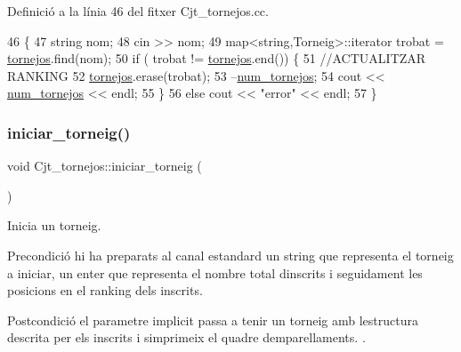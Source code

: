 Definició a la línia 46 del fitxer Cjt\+\_\+tornejos.\+cc.


\begin{DoxyCode}
46                                  \{
47     \textcolor{keywordtype}{string} nom;
48     cin >> nom;
49     map<string,Torneig>::iterator trobat = \mbox{\hyperlink{class_cjt__tornejos_a4b3d9bdd2ed133d76284fb510ebe9800}{tornejos}}.find(nom);
50     \textcolor{keywordflow}{if} ( trobat != \mbox{\hyperlink{class_cjt__tornejos_a4b3d9bdd2ed133d76284fb510ebe9800}{tornejos}}.end()) \{
51         \textcolor{comment}{//ACTUALITZAR RANKING}
52         \mbox{\hyperlink{class_cjt__tornejos_a4b3d9bdd2ed133d76284fb510ebe9800}{tornejos}}.erase(trobat);
53         --\mbox{\hyperlink{class_cjt__tornejos_afe968dc02bf4f83842c53c5a76182f2f}{num\_tornejos}};
54         cout << \mbox{\hyperlink{class_cjt__tornejos_afe968dc02bf4f83842c53c5a76182f2f}{num\_tornejos}} << endl;   
55     \}
56     \textcolor{keywordflow}{else} cout << \textcolor{stringliteral}{"error"} << endl;
57 \}
\end{DoxyCode}
\mbox{\label{class_cjt__tornejos_a2c25098715760c57d0eb2bd1acc02eae}} 
\subsubsection{\texorpdfstring{iniciar\+\_\+torneig()}{iniciar\_torneig()}}
{\footnotesize\ttfamily void Cjt\+\_\+tornejos\+::iniciar\+\_\+torneig (\begin{DoxyParamCaption}{ }\end{DoxyParamCaption})}



Inicia un torneig. 

\begin{DoxyPrecond}{Precondició}
hi ha preparats al canal estandard un string que representa el torneig a iniciar, un enter que representa el nombre total d\textquotesingle{}inscrits i seguidament les posicions en el ranking dels inscrits. 
\end{DoxyPrecond}
\begin{DoxyPostcond}{Postcondició}
el parametre implicit passa a tenir un torneig amb l\textquotesingle{}estructura d\textquotesingle{}escrita per els inscrits i s\textquotesingle{}imprimeix el quadre d\textquotesingle{}emparellaments. . 
\end{DoxyPostcond}
\mbox{\label{class_cjt__tornejos_ac12030fc4c0f063b54d62515f0b818b7}} 
